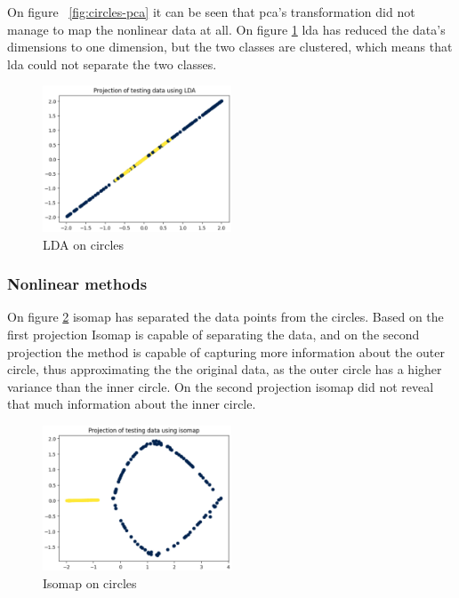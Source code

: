 On figure ~\ref{fig:circles-pca} it can be seen that \gls{pca}'s transformation did not manage to map the nonlinear data at all. On figure \ref{fig:circles-lda} \gls{lda} has reduced the data's dimensions to one dimension, but the two classes are clustered, which means that \gls{lda} could not separate the two classes.

\begin{figure}[h]
    \centering
    \includegraphics[width=0.5\textwidth]{figures/theory-example-figures/circles-lda.png}
    \caption{LDA on circles}
    \label{fig:circles-lda}
    \end{figure}
    
\subsubsection{Nonlinear methods}\label{subsubsec:nonlinear-methods-on-circles}
On figure \ref{fig:circles-isomap} \gls{isomap} has separated the data points from the circles. Based on the first projection Isomap is capable of separating the data, and on the second projection the method is capable of capturing more information about the outer circle, thus approximating the the original data, as the outer circle has a higher variance than the inner circle. On the second projection \gls{isomap} did not reveal that much information about the inner circle.
\begin{figure}[h]
    \centering
    \includegraphics[width=0.5\textwidth]{figures/theory-example-figures/circles-isomap.png}
    \caption{Isomap on circles}
    \label{fig:circles-isomap}
\end{figure}



